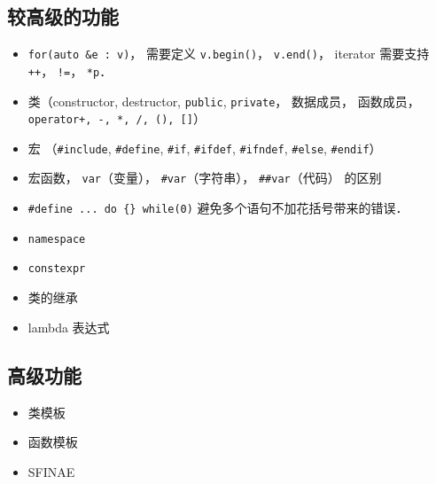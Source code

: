 \subsection{较高级的功能}
\begin{itemize}
\item \verb|for(auto &e : v)|， 需要定义 \verb|v.begin()|， \verb|v.end()|， iterator 需要支持 \verb|++|， \verb|!=|， \verb|*p|．
\item 类（constructor, destructor, \verb|public|, \verb|private|， 数据成员， 函数成员， \verb|operator+, -, *, /, (), []|）
\item 宏 （\verb|#include|, \verb|#define|, \verb|#if|, \verb|#ifdef|, \verb|#ifndef|, \verb|#else|, \verb|#endif|）
\item 宏函数， \verb|var|（变量）， \verb|#var|（字符串）， \verb|##var|（代码） 的区别
\item \verb|#define ... do {} while(0)| 避免多个语句不加花括号带来的错误．
\item \verb|namespace|
\item \verb|constexpr|
\item 类的继承
\item lambda 表达式
\end{itemize}

\subsection{高级功能}
\begin{itemize}
\item 类模板
\item 函数模板
\item SFINAE
\end{itemize}
